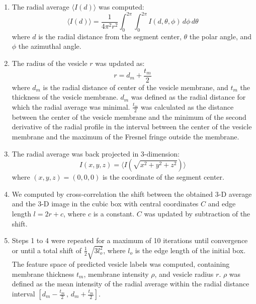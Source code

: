 \begin{enumerate}
\def\labelenumi{\arabic{enumi}.}
\item
  The radial average \(\langle I(d)\rangle\) was computed:
  \begin{equation}\langle I(d)\rangle = \frac{1}{4\pi ^2 r^2} \int_{0}^{2\pi}\int_{0}^{2\pi}I(d,\theta ,\phi) \, d\phi \, d\theta\label{eq:radial_average}\end{equation}
  where \(d\) is the radial distance from the segment center, \(\theta\) the polar angle, and \(\phi\) the azimuthal angle.
\item
  The radius of the vesicle \(r\) was updated as:
  \begin{equation}r = d_m + \frac{t_m}{2}\label{eq:vesicle_radius}\end{equation}
  where \(d_m\) is the radial distance of center of the vesicle membrane, and \(t_m\) the thickness of the vesicle membrane.
  \(d_m\) was defined as the radial distance for which the radial average was minimal.
  \(\frac{t_m}{2}\) was calculated as the distance between the center of the vesicle membrane and the minimum of the second derivative of the radial profile in the interval between the center of the vesicle membrane and the maximum of the Fresnel fringe outside the membrane.
\item
  The radial average was back projected in 3-dimension:
  \begin{equation}I(x,y,z) =  \langle I(\sqrt{x^2+y^2+z^2})\rangle\label{eq:3d-average}\end{equation}
  where \((x,y,z)=(0,0,0)\) is the coordinate of the segment center.
\item
  We computed by cross-correlation the shift between the obtained 3-D average and the 3-D image in the cubic box with central coordinates \(C\) and edge length \(l = 2r + c\), where \(c\) is a constant.
  \(C\) was updated by subtraction of the shift.
\item
  Steps 1 to 4 were repeated for a maximum of 10 iterations until convergence or until a total shift of \(\frac{1}{2}\sqrt{3l_o^2}\), where \(l_o\) is the edge length of the initial box.
  The feature space of predicted vesicle labels was computed, containing membrane thickness \(t_m\), membrane intensity \(\rho\), and vesicle radius \(r\).
  \(\rho\) was defined as the mean intensity of the radial average within the radial distance interval \([d_m - \frac{t_m}{2}\,,\,d_m + \frac{t_m}{2}]\).
\end{enumerate}

